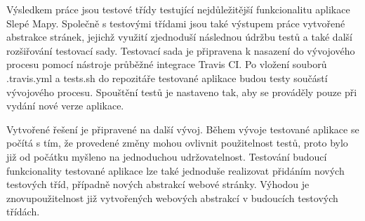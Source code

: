 \documentclass[
    color,   %
	table,   %
    twoside, %
    nolot, nolof
]{fithesis3}
\begin{document}
Výsledkem práce jsou testové třídy testující nejdůležitější funkcionalitu aplikace Slepé Mapy. Společně s testovými třídami jsou také výstupem práce vytvořené abstrakce stránek, jejichž využití zjednoduší následnou údržbu testů a také další rozšiřování testovací sady. Testovací sada je připravena k nasazení do vývojového procesu pomocí nástroje průběžné integrace Travis CI. Po vložení souborů .travis.yml a tests.sh do repozitáře testované aplikace budou testy součástí vývojového procesu. Spouštění testů je nastaveno tak, aby se prováděly pouze při vydání nové verze aplikace.

Vytvořené řešení je připravené na další vývoj. Během vývoje testované aplikace se počítá s tím, že provedené změny mohou ovlivnit použitelnost testů, proto bylo již od počátku myšleno na jednoduchou udržovatelnost. Testování budoucí funkcionality testované aplikace lze také jednoduše realizovat přidáním nových testových tříd, případně nových abstrakcí webové stránky. Výhodou je znovupoužitelnost již vytvořených webových abstrakcí v budoucích testových třídách.
\end{document}
